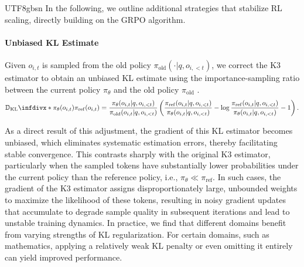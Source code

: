 \documentclass[11pt, a4paper, logo, copyright, nonumbering]{deepseek}
\newcommand{\Dkl}{\mathbb{D}_{\mathrm{KL}}\infdivx*}
\newcommand{\piold}{\pi_{\mathrm{old}}}
\newcommand{\piref}{\pi_{\mathrm{ref}}}
\begin{document}
\begin{CJK*}{UTF8}{gbsn}
In the following, we outline additional strategies that stabilize RL scaling, directly building on the GRPO algorithm.

\paragraph{Unbiased KL Estimate} Given $o_{i,t}$ is sampled from the old policy $\piold(\cdot|q,o_{i,<t})$, we correct the K3 estimator \citep{schulman2020klapprox} to obtain an unbiased KL estimate
using the importance-sampling ratio between the current policy $\pi_\theta$ and the old policy $\piold$ .
\begin{equation}
    \Dkl{\pi_\theta(o_{i,t})}{\piref(o_{i,t})} = 
        \frac{\pi_\theta(o_{i,t}|q,o_{i,<t})}{\piold(o_{i,t}|q,o_{i,<t})}
        \left(
            \frac{\piref(o_{i,t}|q,o_{i,<t})}{\pi_{\theta}(o_{i,t}|q,o_{i,<t})}
            - \log \frac{\piref(o_{i,t}|q,o_{i,<t})}{\pi_{\theta}(o_{i,t}|q,o_{i,<t})} - 1
        \right).
\end{equation}

As a direct result of this adjustment, the gradient of this KL estimator becomes unbiased, which eliminates systematic estimation errors, thereby facilitating stable convergence. This contrasts sharply with the original K3 estimator, particularly when the sampled tokens have substantially lower probabilities under the current policy than the reference policy, i.e., $\pi_\theta \ll \piref$. In such cases, the gradient of the K3 estimator assigns disproportionately large, unbounded weights to maximize the likelihood of these tokens, resulting in noisy gradient updates that accumulate to degrade sample quality in subsequent iterations and lead to unstable training dynamics. In practice, we find that different domains benefit from varying strengths of KL regularization. For certain domains, such as mathematics, applying a relatively weak KL penalty or even omitting it entirely can yield improved performance.


\end{CJK*}
\end{document}
